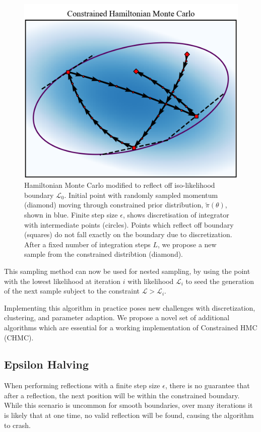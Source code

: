 \documentclass[11pt]{article}
\begin{document}
    \begin{figure}[h!]
        \centering
        \includegraphics[width=\linewidth]{../figures/ConstrainedHMC}
        \caption{
            Hamiltonian Monte Carlo modified to reflect off iso-likelihood boundary $\mathcal{L}_0$.
            Initial point with randomly sampled momentum (diamond) moving through constrained prior
            distribution, $\tilde{\pi}(\theta)$, shown in blue.
            Finite step size $\epsilon$, shows discretisation of integrator with intermediate points (circles).
            Points which reflect off boundary (squares) do not fall exactly on the boundary due to discretization.
            After a fixed number of integration steps $L$, we propose a new sample from the constrained distribtion (diamond).
        }\label{fig:constrainedhmc}
    \end{figure}

    This sampling method can now be used for nested sampling, by using the point with the lowest
    likelihood at iteration $i$ with likelihood $\mathcal{L}_i$ to seed the generation of the next sample subject to
    the constraint $\mathcal{L} > \mathcal{L}_i$.

    Implementing this algorithm in practice poses new challenges with discretization, clustering, and parameter adaption.
    We propose a novel set of additional algorithms which are essential for a working implementation of
    Constrained HMC (CHMC).

\subsection{Epsilon Halving}\label{subsec:epsilon_halving}
    When performing reflections with a finite step size $\epsilon$, there is no guarantee that after a reflection,
    the next position will be within the constrained boundary.
    While this scenario is uncommon for smooth boundaries, over many iterations it is likely that at one time,
    no valid reflection will be found, causing the algorithm to crash.
\end{document}
